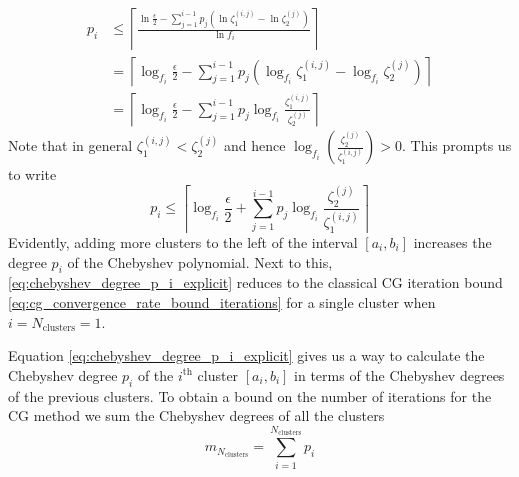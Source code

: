 \begin{align*}
    p_i &\leq \left\lceil\frac{\ln{\frac{\epsilon}{2}} - \sum_{j=1}^{i-1} p_j\left(\ln{\zeta^{(i,j)}_1} - \ln{\zeta^{(j)}_2} \right)}{\ln{f_i}}\right\rceil \\
    &= \left\lceil\log_{f_i}{\frac{\epsilon}{2}} - \sum_{j=1}^{i-1} p_j\left(\log_{f_i}{\zeta^{(i,j)}_1} - \log_{f_i}{\zeta^{(j)}_2} \right)\right\rceil\\
    &= \left\lceil\log_{f_i}{\frac{\epsilon}{2}} - \sum_{j=1}^{i-1} p_j\log_{f_i}{\frac{\zeta^{(i,j)}_1}{\zeta^{(j)}_2}} \right\rceil
\end{align*}
Note that in general $\zeta^{(i,j)}_1 < \zeta^{(j)}_2$ and hence $\log_{f_i}{\left(\frac{\zeta^{(j)}_2}{\zeta^{(i,j)}_1}\right)} > 0$. This prompts us to write
\begin{equation}
    p_i \leq \left\lceil\log_{f_i}{\frac{\epsilon}{2}} + \sum_{j=1}^{i-1} p_j\log_{f_i}{\frac{\zeta^{(j)}_2}{\zeta^{(i,j)}_1}} \right\rceil
    \label{eq:chebyshev_degree_p_i_explicit}
\end{equation}
Evidently, adding more clusters to the left of the interval $[a_i,b_i]$ increases the degree $p_i$ of the Chebyshev polynomial. Next to this, \cref{eq:chebyshev_degree_p_i_explicit} reduces to the classical CG iteration bound \cref{eq:cg_convergence_rate_bound_iterations} for a single cluster when $i = N_{\text{clusters}} = 1$.

Equation \ref{eq:chebyshev_degree_p_i_explicit} gives us a way to calculate the Chebyshev degree $p_i$ of the $i^{\text{th}}$ cluster $[a_i,b_i]$ in terms of the Chebyshev degrees of the previous clusters. To obtain a bound on the number of iterations for the CG method we sum the Chebyshev degrees of all the clusters
\begin{equation}
    m_{N_{\text{clusters}}} = \sum_{i=1}^{N_{\text{clusters}}} p_i
    \label{eq:cg_iteration_bound_multiple_clusters}
\end{equation}


